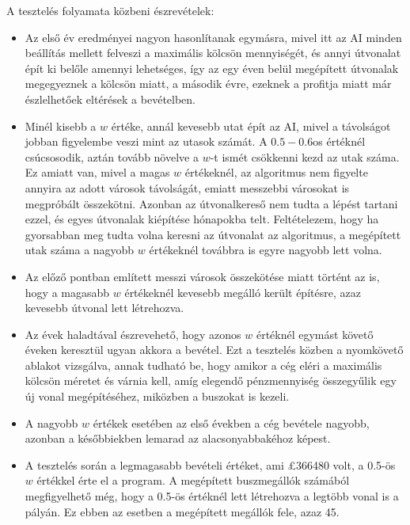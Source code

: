 A tesztelés folyamata közbeni észrevételek:
\begin{itemize}
	\item Az első év eredményei nagyon hasonlítanak egymásra, mivel itt az AI minden beállítás mellett felveszi a maximális kölcsön mennyiségét, és annyi útvonalat épít ki belőle amennyi lehetséges, így az egy éven belül megépített útvonalak megegyeznek a kölcsön miatt, a második évre, ezeknek a profitja miatt már észlelhetőek eltérések a bevételben.
	\item Minél kisebb a $w$ értéke, annál kevesebb utat épít az AI, mivel a távolságot jobban figyelembe veszi mint az utasok számát. A $0.5-0.6$os értéknél csúcsosodik, aztán tovább növelve a $w$-t ismét csökkenni kezd az utak száma. Ez amiatt van, mivel a magas $w$ értékeknél, az algoritmus nem figyelte annyira az adott városok távolságát, emiatt messzebbi városokat is megpróbált összekötni. Azonban az útvonalkereső nem tudta a lépést tartani ezzel, és egyes útvonalak kiépítése hónapokba telt. Feltételezem, hogy ha gyorsabban meg tudta volna keresni az útvonalat az algoritmus, a megépített utak száma a nagyobb $w$ értékeknél továbbra is egyre nagyobb lett volna.
	\item Az előző pontban említett messzi városok összekötése miatt történt az is, hogy a magasabb $w$ értékeknél kevesebb megálló került építésre, azaz kevesebb útvonal lett létrehozva.
	\item Az évek haladtával észrevehető, hogy azonos $w$ értéknél egymást követő éveken keresztül ugyan akkora a bevétel. Ezt a tesztelés közben a nyomkövető ablakot vizsgálva, annak tudható be, hogy amikor a cég eléri a maximális kölcsön méretet és várnia kell, amíg elegendő pénzmennyiség összegyűlik egy új vonal megépítéséhez, miközben a buszokat is kezeli.
	\item A nagyobb $w$ értékek esetében az első években a cég bevétele nagyobb, azonban a későbbiekben lemarad az alacsonyabbakéhoz képest.
	\item A tesztelés során a legmagasabb bevételi értéket, ami \pounds 366480 volt, a 0.5-ös $w$ értékkel érte el a program. A megépített buszmegállók számából megfigyelhető még, hogy a 0.5-ös értéknél lett létrehozva a legtöbb vonal is a pályán. Ez ebben az esetben a megépített megállók fele, azaz 45.
\end{itemize}

